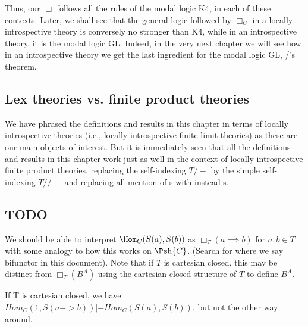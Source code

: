 Thus, our $\Box$ follows all the rules of the modal logic K4, in each of these contexts. Later, we shall see that the general logic followed by $\Box_C$ in a locally introspective theory is conversely no stronger than K4, while in an introspective theory, it is the modal logic GL. Indeed, in the very next chapter we will see how in an introspective theory we get the last ingredient for the modal logic GL, \Loeb/'s theorem.



\subsection{Lex theories vs. finite product theories}
We have phrased the definitions and results in this chapter in terms of locally introspective theories (i.e., locally introspective finite limit theories) as these are our main objects of interest. But it is immediately seen that all the definitions and results in this chapter work just as well in the context of locally introspective finite product theories, replacing the self-indexing $T/-$ by the simple self-indexing $T//-$ and replacing all mention of s with instead s.

\subsection{TODO}
We should be able to interpret $\Hom_C(S(a), S(b))$ as $\Box_T(a \implies b)$ for $a, b \in T$ with some analogy to how this works on $\Psh{C}$. (Search for where we say bifunctor in this document). Note that if $T$ is cartesian closed, this may be distinct from $\Box_T (B^A)$ using the cartesian closed structure of $T$ to define $B^A$.

If T is cartesian closed, we have $Hom_C(1, S(a -> b)) |- Hom_C(S(a), S(b))$, but not the other way around.

\fileend